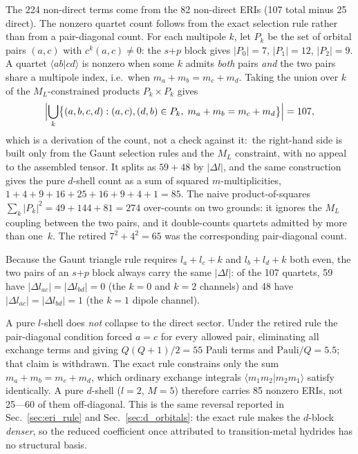 \documentclass[aps,pra,twocolumn,superscriptaddress,longbibliography]{revtex4-2}
\newcommand{\gvq}[2]{#2}
\begin{document}
The 224 non-direct terms come from the 82 non-direct ERIs (\gvq{block_sp_n2_eri}{107} total minus
25 direct).  The nonzero quartet count follows from the exact selection
rule rather than from a pair-diagonal count.  For each multipole $k$, let
$P_k$ be the set of orbital pairs $(a,c)$ with $c^k(a,c) \neq 0$: the
$s$+$p$ block gives $|P_0| = 7$, $|P_1| = 12$, $|P_2| = 9$.  A quartet
$\langle ab|cd\rangle$ is nonzero when some $k$ admits \emph{both} pairs
\emph{and} the two pairs share a multipole index, i.e.\ when
$m_a + m_b = m_c + m_d$.  Taking the union over $k$ of the
$M_L$-constrained products $P_k \times P_k$ gives
\begin{equation}
  \Bigl| \bigcup_{k} \bigl\{ (a,b,c,d) : (a,c),(d,b) \in P_k,\;
  m_a + m_b = m_c + m_d \bigr\} \Bigr| = 107 ,
  \label{eq:eri_union}
\end{equation}
which is a derivation of the count, not a check against it:\ the
right-hand side is built only from the Gaunt selection rules and the
$M_L$ constraint, with no appeal to the assembled tensor.  It splits as
$59 + 48$ by $|\Delta l|$, and the same construction gives the pure
$d$-shell count as a sum of squared $m$-multiplicities,
$1+4+9+16+25+16+9+4+1 = 85$.  The naive product-of-squares
$\sum_k |P_k|^2 = 49 + 144 + 81 = 274$ over-counts on two grounds: it
ignores the $M_L$ coupling between the two pairs, and it double-counts
quartets admitted by more than one~$k$.  The retired $7^2 + 4^2 = 65$ was
the corresponding pair-diagonal count.

Because the Gaunt triangle rule requires $l_a + l_c + k$ and $l_b + l_d + k$
both even, the two pairs of an $s$+$p$ block always carry the same
$|\Delta l|$: of the \gvq{block_sp_n2_eri}{107} quartets, 59 have
$|\Delta l_{ac}| = |\Delta l_{bd}| = 0$ (the $k=0$ and $k=2$ channels) and 48
have $|\Delta l_{ac}| = |\Delta l_{bd}| = 1$ (the $k=1$ dipole channel).

A pure $l$-shell does \emph{not} collapse to the direct sector.  Under the
retired rule the pair-diagonal condition forced $a = c$ for every allowed
pair, eliminating all exchange terms and giving $Q(Q+1)/2 = 55$ Pauli terms
and $\mathrm{Pauli}/Q = 5.5$; that claim is withdrawn.  The exact rule
constrains only the sum $m_a + m_b = m_c + m_d$, which ordinary exchange
integrals $\langle m_1 m_2 | m_2 m_1 \rangle$ satisfy identically.  A pure
$d$-shell ($l=2$, $M=5$) therefore carries \gvq{block_d_eri}{85} nonzero ERIs, not 25---60 of
them off-diagonal.  This is the same reversal reported in
Sec.~\ref{sec:eri_rule} and Sec.~\ref{sec:d_orbitals}: the exact rule makes
the $d$-block \emph{denser}, so the reduced coefficient once attributed to
transition-metal hydrides has no structural basis.
\end{document}
